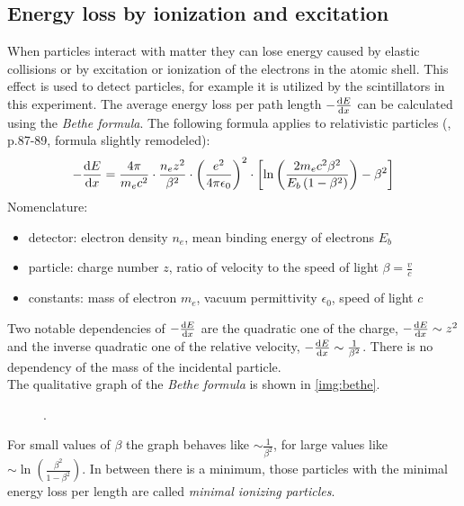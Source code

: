 \subsection{Energy loss by ionization and excitation}
When particles interact with matter they can lose energy caused by elastic collisions or by excitation or ionization of the electrons in the 
atomic shell. This effect is used to detect particles, for example it is utilized by the scintillators in this experiment. The average energy loss per path length 
$-\frac{\mathrm{d} E}{\mathrm{d} x}$ can be calculated using the \emph{Bethe formula}. The following formula applies to relativistic particles (\cite{dem4}, p.87-89, formula slightly remodeled):
\begin{equation}
    - \frac{\mathrm{d} E}{\mathrm{d} x} = \frac{4 \pi}{m_e c^2} \cdot \frac{n_e z^2}{\beta^2} \cdot \left( \frac{e^2}{4 \pi \epsilon_0} \right)^2 \cdot \left[ \ln \left( \frac{2 m_e c^2 \beta^2}{E_b \left( 1-\beta^2 \right)  } \right) - \beta^2 \right]
\end{equation}
Nomenclature: 
\begin{itemize}
  \item detector: electron density $n_e$, mean binding energy of electrons $E_b$
  \item particle: charge number $z$, ratio of velocity to the speed of light $\beta = \frac{v}{c}$
  \item constants: mass of electron $m_e$, vacuum permittivity $\epsilon_0$, speed of light $c$
\end{itemize}
Two notable dependencies of $-\frac{\mathrm{d} E}{\mathrm{d} x}$ are the quadratic one of the charge, $-\frac{\mathrm{d} E}{\mathrm{d} x} \sim z^2$ and the inverse 
quadratic one of the relative velocity, $-\frac{\mathrm{d} E}{\mathrm{d} x} \sim \frac{1}{\beta^2}$. There is no dependency of the mass of the incidental 
particle.\\
The qualitative graph of the \emph{Bethe formula} is shown in \autoref{img:bethe}. 
\begin{figure}[H]
        \centering
        \def\svgwidth{0.55\textwidth}
       
        \caption{.}%
        \label{img:bethe}
\end{figure}
For small values of $\beta$ the graph behaves like $\sim \frac{1}{\beta^2}$, for large values like 
$\sim \ln \left( \frac{\beta^2}{1-\beta^2} \right)$. In between there is a minimum, those particles with the minimal energy loss per length are called 
\emph{minimal ionizing particles}.
